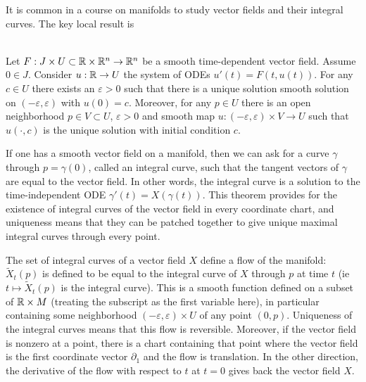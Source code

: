 It is common in a course on manifolds to study vector fields and their integral curves.
The key local result is
\begin{theorem}
\textup{\cite[Theorem~2.1.1]{Sharpe1997}}\cite[Theorem~1.2.1]{Ivey} \\
Let $F : J \times U \subset \mathbb{R}\times\mathbb{R}^n \to \mathbb{R}^n$ be a smooth time-dependent vector field. 
Assume $0 \in J$. 
Consider $u : \mathbb{R} \to U$ the system of ODEs $u'(t) = F(t,u(t))$.
For any $c \in U$ there exists an $\varepsilon > 0$ such that there is a unique solution smooth solution on $(-\varepsilon,\varepsilon)$ with $u(0) = c$.
Moreover, for any $p \in U$ there is an open neighborhood $p \in V \subset U$, $\varepsilon > 0$ and smooth map $u : (-\varepsilon,\varepsilon) \times V \to U$ such that $u(\cdot,c)$ is the unique solution with initial condition $c$.
\end{theorem}

If one has a smooth vector field on a manifold, then we can ask for a curve $\gamma$ through $p = \gamma(0)$, called an integral curve, such that the tangent vectors of $\gamma$ are equal to the vector field.
In other words, the integral curve is a solution to the time-independent ODE $\gamma'(t) = X(\gamma(t))$.
This theorem provides for the existence of integral curves of the vector field in every coordinate chart, and uniqueness means that they can be patched together to give unique maximal integral curves through every point.

The set of integral curves of a vector field $X$ define a flow of the manifold: $\tilde{X}_t(p)$ is defined to be equal to the integral curve of $X$ through $p$ at time $t$ (ie $t \mapsto \tilde{X}_t(p)$ is the integral curve).
This is a smooth function defined on a subset of $\mathbb{R} \times M$ (treating the subscript as the first variable here), in particular containing some neighborhood $(-\varepsilon,\varepsilon) \times U$ of any point $(0,p)$.
Uniqueness of the integral curves means that this flow is reversible.
Moreover, if the vector field is nonzero at a point, there is a chart containing that point where the vector field is the first coordinate vector $\partial_1$ and the flow is translation.
In the other direction, the derivative of the flow with respect to $t$ at $t=0$ gives back the vector field $X$.

